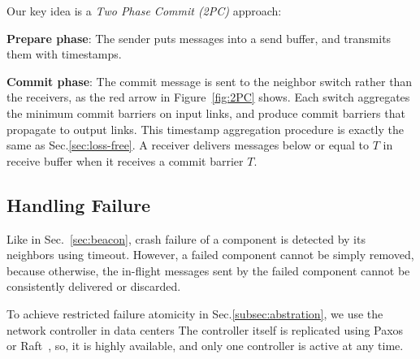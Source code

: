 Our key idea  is a \emph{Two Phase Commit (2PC)} approach: %

\begin{ecompact}
\item \textbf{Prepare phase}: The sender puts messages into a send buffer, and transmits them with timestamps. 
\item \textbf{Commit phase}:  The commit message is sent to the neighbor switch rather than the receivers, as the red arrow in Figure~\ref{fig:2PC} shows. Each switch aggregates the minimum commit barriers on input links, and produce commit barriers that propagate to output links. This timestamp aggregation procedure is exactly the same as Sec.\ref{sec:loss-free}. A receiver delivers messages below or equal to $T$ in receive buffer when it receives a commit barrier $T$. 
\end{ecompact}

\subsection{Handling Failure}

Like in Sec.~\ref{sec:beacon}, crash failure of a component is detected by its neighbors using timeout.
However, a failed component cannot be simply removed, because otherwise, the in-flight messages sent by the failed component cannot be consistently delivered or discarded.

To achieve restricted failure atomicity in Sec.\ref{subsec:abstration}, we use the network controller in data centers 
The controller itself is replicated using Paxos~\cite{lamport1998part} or Raft~\cite{raft}, so, it is highly available, and only one controller is active at any time.

